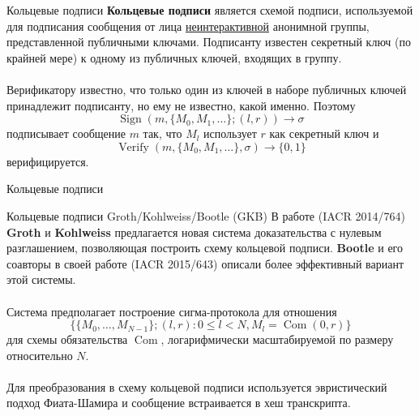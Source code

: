 \documentclass[aspectratio=169]{beamer}
\newcommand{\com}{\operatorname{Com}}
\begin{document}
\begin{frame}{Кольцевые подписи}
\textbf{Кольцевые подписи} является схемой подписи, используемой для подписания сообщения от лица \underline{неинтерактивной} анонимной группы, представленной публичными ключами. Подписанту известен секретный ключ (по крайней мере) к одному из публичных ключей, входящих в группу.
\\~\\
Верификатору известно, что только один из ключей в наборе публичных ключей принадлежит подписанту, но ему не известно, какой именно. Поэтому
$$\operatorname{Sign}(m,\{M_0,M_1,\ldots\};(l,r)) \to \sigma$$
подписывает сообщение $m$ так, что $M_l$ использует $r$ как секретный ключ и
$$\operatorname{Verify}(m,\{M_0,M_1,\ldots\},\sigma) \to \{0,1\}$$
верифицируется.
\end{frame}


\begin{frame}{Кольцевые подписи}
\begin{center}
\end{center}
\end{frame}


\begin{frame}{Кольцевые подписи Groth/Kohlweiss/Bootle (GKB)}
В работе (IACR 2014/764) \textbf{Groth} и \textbf{Kohlweiss} предлагается новая система доказательства с нулевым разглашением, позволяющая построить схему кольцевой подписи. \textbf{Bootle} и его соавторы в своей работе (IACR 2015/643) описали более эффективный вариант этой системы.
\\~\\
Система предполагает построение сигма-протокола для отношения
$$\Big\{\{M_0,\ldots,M_{N-1}\};(l,r) : 0 \leq l < N, M_l = \com(0,r)\Big\}$$
для схемы обязательства $\com$, логарифмически масштабируемой по размеру относительно $N$.
\\~\\
Для преобразования в схему кольцевой подписи используется эвристический подход Фиата-Шамира и сообщение встраивается в хеш транскрипта.
\end{frame}
\end{document}
